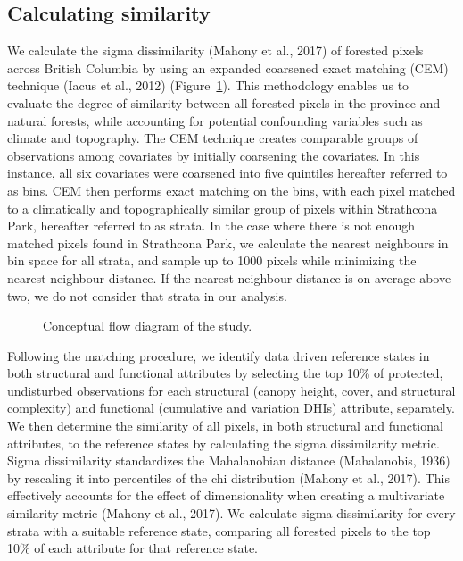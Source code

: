 \documentclass[
]{agujournal2019}
\begin{document}
\subsection{Calculating similarity}\label{sec-sim}

We calculate the sigma dissimilarity (Mahony et al., 2017) of forested
pixels across British Columbia by using an expanded coarsened exact
matching (CEM) technique (Iacus et al., 2012) (Figure~\ref{fig-flow}).
This methodology enables us to evaluate the degree of similarity between
all forested pixels in the province and natural forests, while
accounting for potential confounding variables such as climate and
topography. The CEM technique creates comparable groups of observations
among covariates by initially coarsening the covariates. In this
instance, all six covariates were coarsened into five quintiles
hereafter referred to as bins. CEM then performs exact matching on the
bins, with each pixel matched to a climatically and topographically
similar group of pixels within Strathcona Park, hereafter referred to as
strata. In the case where there is not enough matched pixels found in
Strathcona Park, we calculate the nearest neighbours in bin space for
all strata, and sample up to 1000 pixels while minimizing the nearest
neighbour distance. If the nearest neighbour distance is on average
above two, we do not consider that strata in our analysis.

\label{cell-fig-flow}
\begin{figure}[H]


\caption{\label{fig-flow}Conceptual flow diagram of the study.}

\end{figure}%

Following the matching procedure, we identify data driven reference
states in both structural and functional attributes by selecting the top
10\% of protected, undisturbed observations for each structural (canopy
height, cover, and structural complexity) and functional (cumulative and
variation DHIs) attribute, separately. We then determine the similarity
of all pixels, in both structural and functional attributes, to the
reference states by calculating the sigma dissimilarity metric. Sigma
dissimilarity standardizes the Mahalanobian distance (Mahalanobis, 1936)
by rescaling it into percentiles of the chi distribution (Mahony et al.,
2017). This effectively accounts for the effect of dimensionality when
creating a multivariate similarity metric (Mahony et al., 2017). We
calculate sigma dissimilarity for every strata with a suitable reference
state, comparing all forested pixels to the top 10\% of each attribute
for that reference state.
\end{document}
